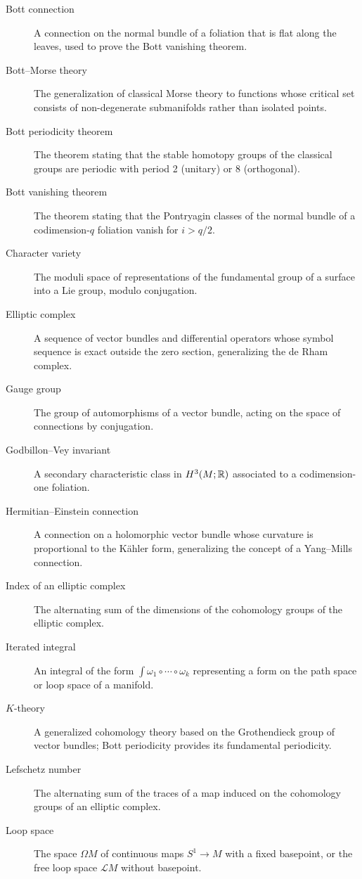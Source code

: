 \begin{description}
    \item[Bott connection] A connection on the normal bundle of a foliation that is flat along the leaves, used to prove the Bott vanishing theorem.
    \item[Bott--Morse theory] The generalization of classical Morse theory to functions whose critical set consists of non-degenerate submanifolds rather than isolated points.
    \item[Bott periodicity theorem] The theorem stating that the stable homotopy groups of the classical groups are periodic with period 2 (unitary) or 8 (orthogonal).
    \item[Bott vanishing theorem] The theorem stating that the Pontryagin classes of the normal bundle of a codimension-\(q\) foliation vanish for \(i > q/2\).
    \item[Character variety] The moduli space of representations of the fundamental group of a surface into a Lie group, modulo conjugation.
    \item[Elliptic complex] A sequence of vector bundles and differential operators whose symbol sequence is exact outside the zero section, generalizing the de Rham complex.
    \item[Gauge group] The group of automorphisms of a vector bundle, acting on the space of connections by conjugation.
    \item[Godbillon--Vey invariant] A secondary characteristic class in \(H^3(M; \mathbb{R})\) associated to a codimension-one foliation.
    \item[Hermitian--Einstein connection] A connection on a holomorphic vector bundle whose curvature is proportional to the K\"ahler form, generalizing the concept of a Yang--Mills connection.
    \item[Index of an elliptic complex] The alternating sum of the dimensions of the cohomology groups of the elliptic complex.
    \item[Iterated integral] An integral of the form \(\int \omega_1 \circ \cdots \circ \omega_k\) representing a form on the path space or loop space of a manifold.
    \item[\(K\)-theory] A generalized cohomology theory based on the Grothendieck group of vector bundles; Bott periodicity provides its fundamental periodicity.
    \item[Lefschetz number] The alternating sum of the traces of a map induced on the cohomology groups of an elliptic complex.
    \item[Loop space] The space \(\Omega M\) of continuous maps \(S^1 \to M\) with a fixed basepoint, or the free loop space \(\mathcal{L}M\) without basepoint.

\end{description}
